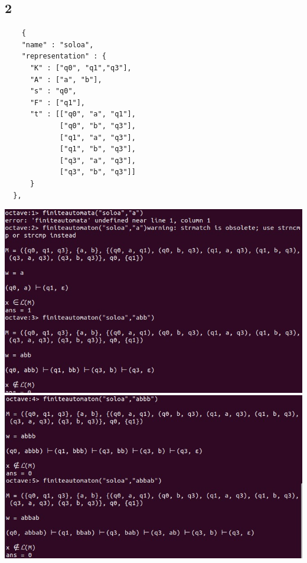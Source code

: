 \documentclass{article}
\begin{document}
\subsection{2}
\begin{verbatim}
    {
    "name" : "soloa",
    "representation" : {
      "K" : ["q0", "q1","q3"],
      "A" : ["a", "b"],
      "s" : "q0",
      "F" : ["q1"],
      "t" : [["q0", "a", "q1"],
             ["q0", "b", "q3"],
             ["q1", "a", "q3"],
             ["q1", "b", "q3"],
             ["q3", "a", "q3"],
             ["q3", "b", "q3"]]
      }
  },
\end{verbatim}
\includegraphics[width=15cm]{octavefin13.jpg}
\includegraphics[width=15cm]{octav32.jpg}
\end{document}
